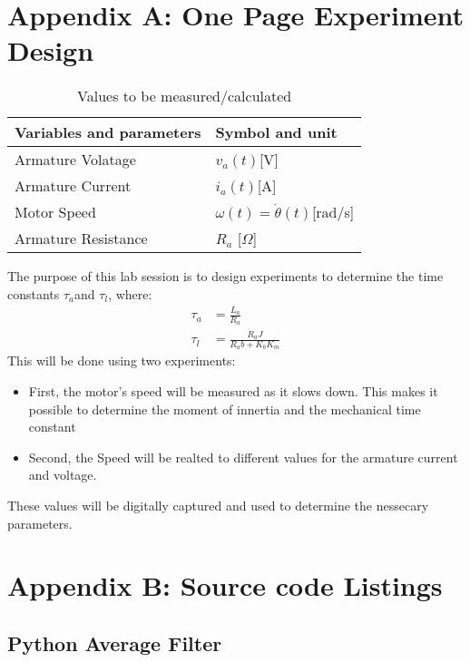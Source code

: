\chapter{Appendix A: One Page Experiment Design}
\label{apx:A}

\begin{table}[h]
\centering
\caption{Values to be measured/calculated}
\label{my-label}
\begin{tabular}{@{}ll@{}}
\toprule
Variables and parameters & Symbol and unit                          \\ \midrule
Armature Volatage        & $v_a(t)${[}V{]}                          \\
Armature Current         & $i_a(t)${[}A{]}                          \\
Motor Speed              & $\omega(t) = \dot{\theta}(t)${[}rad/s{]} \\
Armature Resistance      & $R_a$ {[}$\Omega${]}                     \\ \bottomrule
\end{tabular}
\end{table}

The purpose of this lab session is to design experiments to determine the time constants $\tau_a$and $\tau_l$, where:\\
\begin{align*}
\tau_a & = \frac{L_a}{R_a} \\
\tau_l & = \frac{R_aJ}{R_ab+K_bK_m} 
\end{align*}
This will be done using two experiments:
\begin{itemize}
	\item First, the motor's speed will be measured as it slows down. This makes it possible to determine the moment of innertia and the mechanical time constant
	\item Second, the Speed will be realted to different values for the armature current and voltage.
\end{itemize}
These values will be digitally captured and used to determine the nessecary parameters.

\chapter{Appendix B: Source code Listings}
\label{apx:B}
\section{Python Average Filter}


